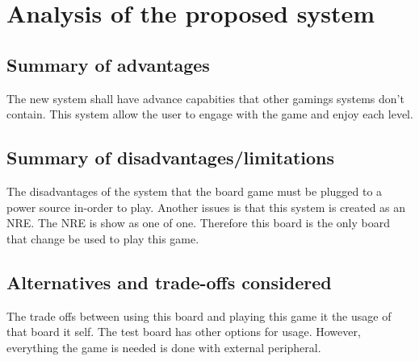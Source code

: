 
\chapter{Analysis of the proposed system}
\label{loc:Analysis of the proposed system}
% 


\section{Summary of advantages}
\label{loc:Summary of advantages}
% 

The new system shall have advance capabities that other gamings systems don't contain. This system allow the user to engage with the game and enjoy each level.

\section{Summary of disadvantages/limitations}
\label{loc:Summary of disadvantages/limitations}
% 

The disadvantages of the system that the board game must be plugged to a power source in-order to play. Another issues is that this system is created as an NRE. The NRE is show as one of one. Therefore this board is the only board that change be used to play this game.

\section{Alternatives and trade-offs considered}
\label{loc:Alternatives and trade-offs considered}
% 

The trade offs between using this board and playing this game it the usage of that board it self. The test board has other options for usage. However, everything the game is needed is done with external peripheral.